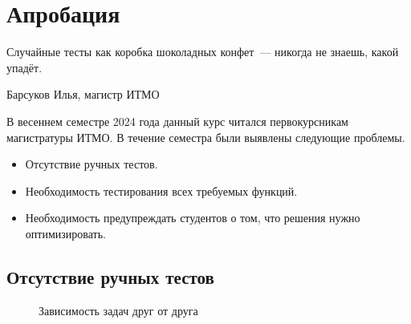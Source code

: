 
\section{Апробация}

\epigraph{Случайные тесты как коробка шоколадных конфет~--- никогда не знаешь, какой упадёт.}{Барсуков Илья, магистр ИТМО}

В весеннем семестре 2024 года данный курс читался первокурсникам магистратуры ИТМО.
В течение семестра были выявлены следующие проблемы.
\begin{itemize}
    \item Отсутствие ручных тестов.
    \item Необходимость тестирования всех требуемых функций.
    \item Необходимость предупреждать студентов о том, что решения нужно оптимизировать.
\end{itemize}

\subsection{Отсутствие ручных тестов}

\begin{figure}[b]
    \caption{Зависимость задач друг от друга}
    \label{fig:dependencies}
    \centering
\end{figure}

